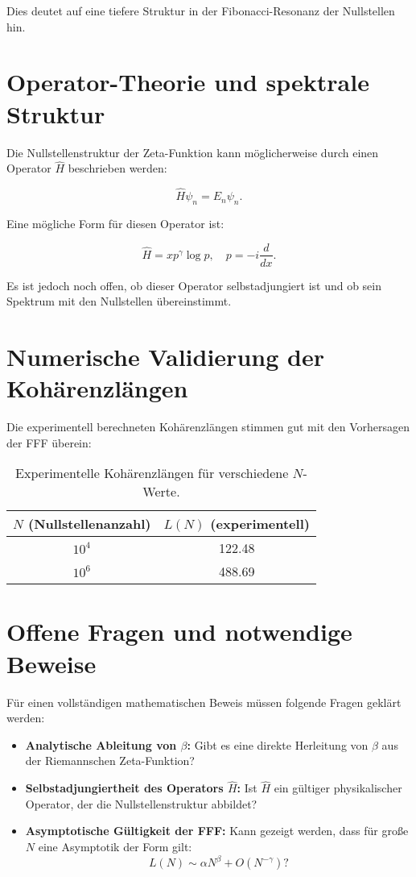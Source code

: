 \documentclass[a4paper,12pt]{article}
\begin{document}
Dies deutet auf eine tiefere Struktur in der Fibonacci-Resonanz der Nullstellen hin.

\section{Operator-Theorie und spektrale Struktur}
Die Nullstellenstruktur der Zeta-Funktion kann möglicherweise durch einen Operator $\hat{H}$ beschrieben werden:

\begin{equation}
\hat{H} \psi_n = E_n \psi_n.
\end{equation}

Eine mögliche Form für diesen Operator ist:

\begin{equation}
\hat{H} = x p^\gamma \log p, \quad p = -i \frac{d}{dx}.
\end{equation}

Es ist jedoch noch offen, ob dieser Operator selbstadjungiert ist und ob sein Spektrum mit den Nullstellen übereinstimmt.

\section{Numerische Validierung der Kohärenzlängen}
Die experimentell berechneten Kohärenzlängen stimmen gut mit den Vorhersagen der FFF überein:

\begin{table}[h]
    \centering
    \begin{tabular}{|c|c|}
    \hline
    $N$ (Nullstellenanzahl) & $L(N)$ (experimentell) \\
    \hline
    $10^4$ & 122.48 \\
    $10^6$ & 488.69 \\
    \hline
    \end{tabular}
    \caption{Experimentelle Kohärenzlängen für verschiedene $N$-Werte.}
\end{table}

\section{Offene Fragen und notwendige Beweise}
Für einen vollständigen mathematischen Beweis müssen folgende Fragen geklärt werden:

\begin{itemize}
    \item \textbf{Analytische Ableitung von $\beta$:} Gibt es eine direkte Herleitung von $\beta$ aus der Riemannschen Zeta-Funktion?
    \item \textbf{Selbstadjungiertheit des Operators $\hat{H}$:} Ist $\hat{H}$ ein gültiger physikalischer Operator, der die Nullstellenstruktur abbildet?
    \item \textbf{Asymptotische Gültigkeit der FFF:} Kann gezeigt werden, dass für große $N$ eine Asymptotik der Form gilt:
    \begin{equation}
    L(N) \sim \alpha N^\beta + O(N^{-\gamma})?
    \end{equation}
\end{itemize}
\end{document}

